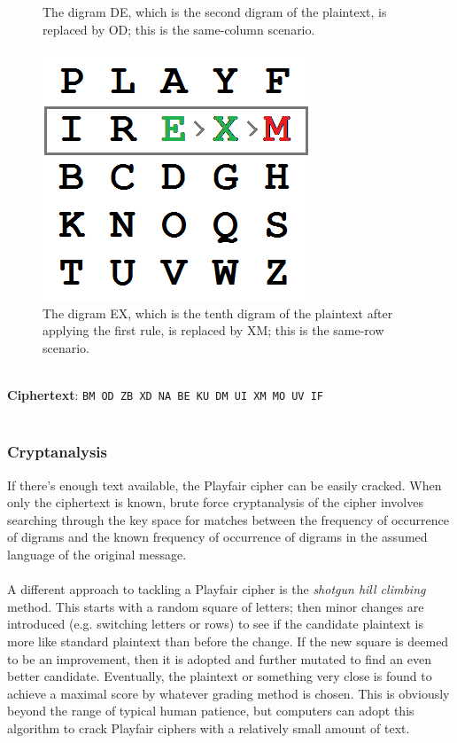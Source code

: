 \documentclass[Lau,binding=0.6cm,oneside]{sapthesis}
\begin{document}
\begin{figure}[H]
  \caption{The digram \textsf{DE}, which is the second digram of the plaintext, is replaced by \textsf{OD}; this is the same-column scenario.}
\endminipage\hfill
{}%
  \includegraphics[width=\linewidth]{playfair_10}
  \caption{The digram \textsf{EX}, which is the tenth digram of the plaintext after applying the first rule, is replaced by \textsf{XM}; this is the same-row scenario.}
\endminipage
\end{figure}
\ \\
\textbf{Ciphertext}: \colorbox{gray!12}{\small{\texttt{BM OD ZB XD NA BE KU DM UI XM MO UV IF}}}\\\\

\subsubsection{Cryptanalysis}
If there's enough text available, the Playfair cipher can be easily cracked. When only the ciphertext is known, brute force cryptanalysis of the cipher involves searching through the key space for matches between the frequency of occurrence of digrams and the known frequency of occurrence of digrams in the assumed language of the original message.\\\\
A different approach to tackling a Playfair cipher is the \textit{shotgun hill climbing} method. This starts with a random square of letters; then minor changes are introduced (e.g. switching letters or rows) to see if the candidate plaintext is more like standard plaintext than before the change. If the new square is deemed to be an improvement, then it is adopted and further mutated to find an even better candidate. Eventually, the plaintext or something very close is found to achieve a maximal score by whatever grading method is chosen. This is obviously beyond the range of typical human patience, but computers can adopt this algorithm to crack Playfair ciphers with a relatively small amount of text.\\\\
\end{document}
